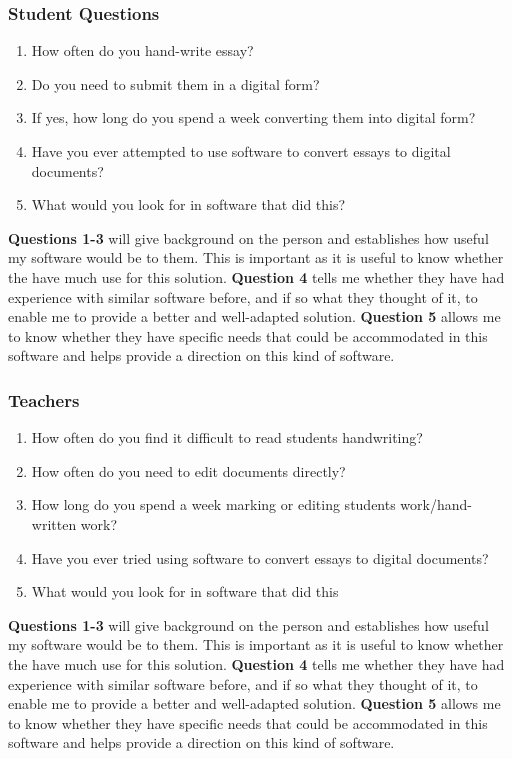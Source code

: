 \documentclass{report}
\begin{document}
\subsubsection{Student Questions}
\begin{enumerate}
    \item How often do you hand-write essay?
    \item Do you need to submit them in a digital form?
    \item If yes, how long do you spend a week converting them into digital form?
    \item Have you ever attempted to use software to convert essays to digital documents?
    \item What would you look for in software that did this?
\end{enumerate}
\textbf{Questions 1-3} will give background on the person and establishes how useful my software would be to them. This is important as it is useful to know whether the have much use for this solution.
\newline
\textbf{Question 4} tells me whether they have had experience with similar software before, and if so what they thought of it, to enable me to provide a better and well-adapted solution.
\newline
\textbf{Question 5} allows me to know whether they have specific needs that could be accommodated in this software and helps provide a direction on this kind of software.

\subsubsection{Teachers}
\begin{enumerate}
    \item How often do you find it difficult to read students handwriting?
    \item How often do you need to edit documents directly?
    \item How long do you spend a week marking or editing students work/hand-written work?
    \item Have you ever tried using software to convert essays to digital documents?
    \item What would you look for in software that did this
\end{enumerate}
\textbf{Questions 1-3} will give background on the person and establishes how useful my software would be to them. This is important as it is useful to know whether the have much use for this solution.
\newline
\textbf{Question 4} tells me whether they have had experience with similar software before, and if so what they thought of it, to enable me to provide a better and well-adapted solution.
\newline
\textbf{Question 5} allows me to know whether they have specific needs that could be accommodated in this software and helps provide a direction on this kind of software.
\end{document}
